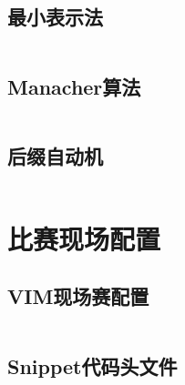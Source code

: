 \documentclass[a4paper,12pt]{article}
\begin{document}
\subsection{最小表示法}
\inputminted[breaklines]{c++}{string/minimal.cc}
\subsection{Manacher算法}
\inputminted[breaklines]{c++}{string/manacher.cc}
\subsection{后缀自动机}
\inputminted[breaklines]{c++}{string/suffix-automaton.cc}


\newpage
\section{比赛现场配置}
\subsection{VIM现场赛配置}
\inputminted[breaklines]{bash}{others/vim.bash}
\subsection{Snippet代码头文件}
\inputminted[breaklines]{c++}{others/head.cc}
\end{document}
